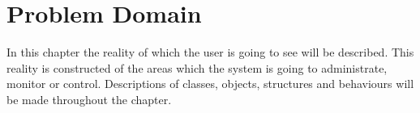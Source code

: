 \chapter{Problem Domain}
In this chapter the reality of which the user is going to see will be described. This reality is constructed of the areas which the system is going to administrate, monitor or control. Descriptions of classes, objects, structures and behaviours will be made throughout the chapter.


